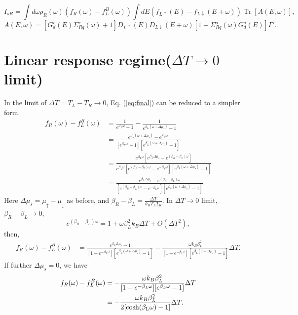\documentclass[11pt,a4paper]{article}
\begin{document}
\begin{equation}
I_{s R}=\int d \omega \rho_{R}(\omega)\left(f_{R}(\omega)-f_{L}^{B}(\omega)\right) \int d E\left(f_{L \uparrow}(E)-f_{L \downarrow}(E+\omega)\right) \operatorname{Tr}[A(E, \omega)],
\label{eq:final}
\end{equation}
\begin{equation}
A(E, \omega)=\left[G_{d}^{r}(E) \Sigma_{R q}^{r}(\omega)+1\right] D_{L \uparrow}(E) D_{L \downarrow}(E+\omega)\left[1+\Sigma_{R q}^{a}(\omega) G_{d}^{a}(E)\right]\Gamma'.
\end{equation}
\section{Linear response regime($\Delta T\to 0$ limit)}
In the limit of $\Delta T=T_{L}-T_{R} \to 0$, Eq. (\ref{eq:final}) can be reduced to a simpler form.
\begin{equation}
\begin{split}
f_{R}(\omega)-f_{L}^{B}(\omega) &= \frac{1}{e^{\beta_{R}\omega}-1} - \frac{1}{e^{\beta_{L}(\omega+\Delta\mu_{s})}-1} \\
&= \frac{e^{\beta_{L}(\omega+\Delta\mu_{s})} - e^{\beta_{R}\omega}}{[e^{\beta_{R}\omega}-1][e^{\beta_{L}(\omega+\Delta\mu_{s})}-1]} \\
&= \frac{e^{\beta_{L}\omega}[e^{\beta_{L}\Delta\mu_{s}} - e^{(\beta_{R}-\beta_{L})\omega}]}{e^{\beta_{L}\omega}[e^{(\beta_{R}-\beta_{L})\omega}-e^{-\beta_{L}\omega}][e^{\beta_{L}(\omega+\Delta\mu_{s})}-1]} \\
&= \frac{e^{\beta_{L}\Delta\mu_{s}} - e^{(\beta_{R}-\beta_{L})\omega}}{[e^{(\beta_{R}-\beta_{L})\omega}-e^{-\beta_{L}\omega}][e^{\beta_{L}(\omega+\Delta\mu_{s})}-1]}.
\end{split}
\end{equation}
Here $\Delta\mu_{s} = \mu_{\uparrow} - \mu_{\downarrow}$ as before, and $\beta_{R}-\beta_L = \frac{\Delta T}{k_{B}T_{L}T_{R}}$. In $\Delta T\to 0$ limit, $\beta_{R}-\beta_{L} \to 0$,
\begin{equation}
e^{(\beta_{R}-\beta_{L})\omega} = 1 + \omega\beta_{L}^{2} k_{B}\Delta T + O(\Delta T^{2}),
\end{equation}
then,
\begin{equation}
\begin{split}
f_{R}(\omega)-f_{L}^{B}(\omega) &= \frac{e^{\beta_{L}\Delta\mu_{s}} - 1} {[ 1 - e^{-\beta_{L}\omega}][e^{\beta_{L}(\omega+\Delta\mu_{s})}-1]} - \frac{\omega k_{B}\beta_{L}^{2} } {[ 1 - e^{-\beta_{L}\omega}] [e^{\beta_{L} (\omega+\Delta \mu_{s})}-1]}\Delta T. 
\end{split}
\end{equation}
If further $\Delta\mu_{s} = 0$, we have
\begin{equation}
\begin{split}
f_{R}(\omega)-f_{L}^{B}(\omega) &= - \frac{\omega k_{B}\beta_{L}^{2}} {[ 1 - e^{-\beta_{L}\omega}] [e^{\beta_{L} \omega}-1]}\Delta T \\
&=  - \frac{\omega k_{B}\beta_{L}^{2}} {2[\rm{cosh}(\beta_{L}\omega)-1]}\Delta T.
\end{split}
\end{equation}
\end{document}
